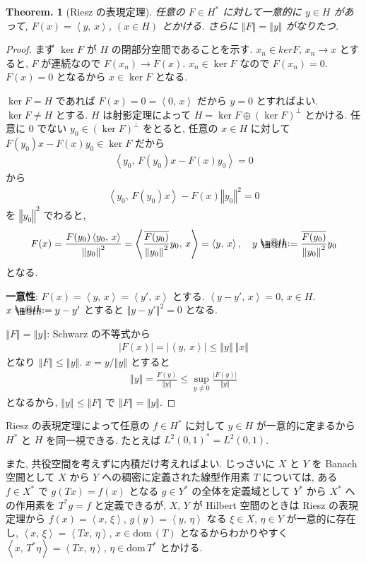 \documentclass[openany, a4paper, oneside]{jsbook}
\makeatletter
\newcommand*{\defeq}{\mathrel{\rlap{%
\raisebox{0.3ex}{$\m@th\cdot$}}%
\raisebox{-0.3ex}{$\m@th\cdot$}}%
=}
\newcommand{\dom}{\mathrm{dom}\,}
\theoremstyle{break}
\theoremstyle{breakdefn}
\newtheorem{thm}{Theorem.}[section]
\newcommand{\abs}[1]{\left|#1\right|}
\newcommand{\norm}[1]{\left\Vert#1\right\Vert}
\newcommand{\rbk}[1]{\left (#1\right)}
\newcommand{\bkt}[2]{\left\langle#1,\,#2\right\rangle}
\makeatother
\begin{document}
\begin{thm}[Riesz の表現定理]\label{functional_analysis_hilbert_space_yukimi_11}
 任意の $F \in H^*$ に対して一意的に $y \in H$ があって, $F(x) = \bkt{y}{x}$, $(x \in H)$ とかける.
 さらに $\norm{F} = \norm{y}$ がなりたつ.
\end{thm}
\begin{proof}
まず $\ker F$ が $H$ の閉部分空間であることを示す.
$x_n \in ker F$, $x_{n} \to x$ とすると,
$F$ が連続なので $F (x_n) \to F (x)$.
$x_n \in \ker F$ なので $F (x_n) = 0$.
$F(x) = 0$ となるから $x \in \ker F$ となる.

$\ker F = H$ であれば $F(x) = 0 = \bkt{0}{x}$ だから $y = 0$ とすればよい.
$\ker F \neq H$ とする.
$H$ は射影定理によって $H = \ker F \oplus (\ker F)^\perp$ とかける.
任意に $0$ でない $y_0 \in (\ker F)^\perp$ をとると, 任意の $x \in H$ に対して
$F(y_0) x - F (x) y_0 \in \ker F$ だから
\begin{align}
 \bkt{y_0}{F \rbk{y_0} x - F(x) y_0}
 =
 0
\end{align}
から
\begin{align}
 \bkt{y_0}{F(y_0) x} - F(x) \norm{y_0}^2
 =
 0
\end{align}
を $\norm{y_0}^2$ でわると,
\begin{align}
 F(x)
 =
 \frac{F(y_0) \bkt{y_0}{x}}{\norm{y_0}^2}
 =
 \bkt{\frac{\overline{F(y_0)}}{\norm{y_0}^2} y_0}{x}
 =
 \bkt{y}{x}, \quad
 y
 \defeq
 \frac{\overline{F(y_0)}}{\norm{y_0}^2} y_0
\end{align}
となる.

\textbf{一意性}:
$F (x) = \bkt{y}{x} = \bkt{y'}{x}$ とする.
$\bkt{y - y'}{x} = 0$, $x \in H$.
$x \defeq y - y'$ とすると $\norm{y - y'}^2 = 0$ となる.

$\norm{F} = \norm{y}$:
Schwarz の不等式から
\begin{align}
 \abs{F(x)}
 =
 \abs{\bkt{y}{x}}
 \leq
 \norm{y} \, \norm{x}
\end{align}
となり $\norm{F} \leq \norm{y}$.
$x = y / \norm{y}$ とすると
\begin{align}
 \norm{y} = \frac{F(y)}{\norm{y}}
 \leq
 \sup_{y \neq 0} \frac{\abs{F(y)}}{\norm{y}}
\end{align}
となるから,  $\norm{y} \leq \norm{F}$ で $\norm{F} = \norm{y}$.
\end{proof}

Riesz の表現定理によって任意の $f \in H^*$ に対して $y \in H$ が一意的に定まるから
$H^*$ と $H$ を同一視できる.
たとえば $L^2 (0, 1)^* = L^2 (0, 1)$.

また, 共役空間を考えずに内積だけ考えればよい.
じっさいに $X$ と $Y$ を Banach 空間として $X$ から $Y$ への稠密に定義された線型作用素 $T$ については,
ある $f \in X^*$ で $g (Tx) = f (x)$ となる $g \in Y^*$ の全体を定義域として
$Y^*$ から $X^*$ への作用素を $T^*g = f$ と定義できるが,
$X$, $Y$ が Hilbert 空間のときは Riesz の表現定理から
$f (x) = \bkt{x}{\xi}$, $g (y) = \bkt{y}{\eta}$ なる $\xi \in X$,
$\eta \in Y$ が一意的に存在し,
$\bkt{x}{\xi} = \bkt{Tx}{\eta}$,
$x \in \dom (T)$ となるからわかりやすく
$\bkt{x}{T^* \eta} = \bkt{Tx}{\eta}$, $\eta \in \dom T^*$ とかける.
\end{document}
